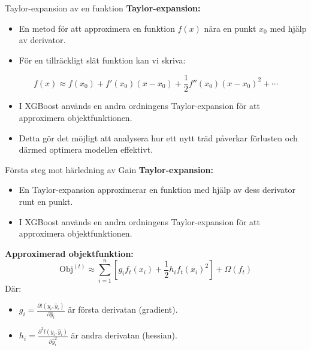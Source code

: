 \documentclass[10pt,english]{beamer}
\begin{document}
\begin{frame}{Taylor-expansion av en funktion}
  \textbf{Taylor-expansion:}
  \begin{itemize}
    \item En metod för att approximera en funktion \( f(x) \) nära en punkt \( x_0 \) med hjälp av derivator.
    \item För en tillräckligt slät funktion kan vi skriva:
  \end{itemize}

  \begin{equation*}
    f(x) \approx f(x_0) + f'(x_0)(x - x_0) + \frac{1}{2} f''(x_0)(x - x_0)^2 + \cdots
  \end{equation*}

  \begin{itemize}
    \item I XGBoost används en andra ordningens Taylor-expansion för att approximera objektfunktionen.
    \item Detta gör det möjligt att analysera hur ett nytt träd påverkar förlusten och därmed optimera modellen effektivt.
  \end{itemize}
\end{frame}

\begin{frame}{Första steg mot härledning av Gain}
  \textbf{Taylor-expansion:}
  \begin{itemize}
    \item En Taylor-expansion approximerar en funktion med hjälp av dess derivator runt en punkt.
    \item I XGBoost används en andra ordningens Taylor-expansion för att approximera objektfunktionen.
  \end{itemize}

  \vspace{0.1cm}
  \textbf{Approximerad objektfunktion:}
  \begin{equation*}
    \text{Obj}^{(t)} \approx \sum_{i=1}^{n} \left[ g_i f_t(x_i) + \frac{1}{2} h_i f_t(x_i)^2 \right] + \Omega(f_t)
  \end{equation*}
  Där:
  \begin{itemize}
    \item \( g_i = \frac{\partial l(y_i, \hat{y}_i)}{\partial \hat{y}_i} \) är första derivatan (gradient).
    \item \( h_i = \frac{\partial^2 l(y_i, \hat{y}_i)}{\partial \hat{y}_i^2} \) är andra derivatan (hessian).
  \end{itemize}
\end{frame}
\end{document}
